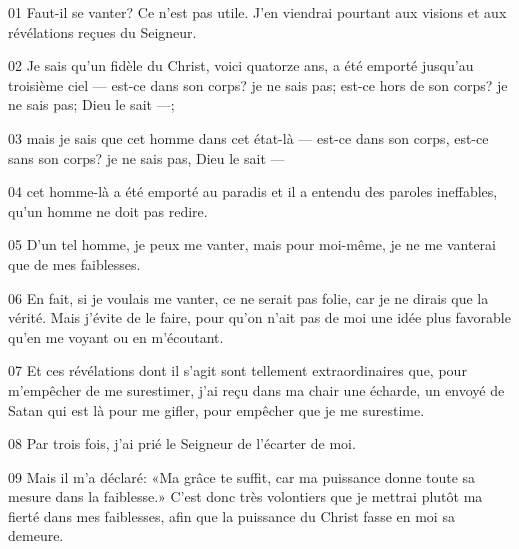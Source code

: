 01 Faut-il se vanter? Ce n’est pas utile. J’en viendrai pourtant aux visions et aux révélations reçues du Seigneur.

02 Je sais qu’un fidèle du Christ, voici quatorze ans, a été emporté jusqu’au troisième ciel --- est-ce dans son corps? je ne sais pas; est-ce hors de son corps? je ne sais pas; Dieu le sait ---;

03 mais je sais que cet homme dans cet état-là --- est-ce dans son corps, est-ce sans son corps? je ne sais pas, Dieu le sait ---

04 cet homme-là a été emporté au paradis et il a entendu des paroles ineffables, qu’un homme ne doit pas redire.

05 D’un tel homme, je peux me vanter, mais pour moi-même, je ne me vanterai que de mes faiblesses.

06 En fait, si je voulais me vanter, ce ne serait pas folie, car je ne dirais que la vérité. Mais j’évite de le faire, pour qu’on n’ait pas de moi une idée plus favorable qu’en me voyant ou en m’écoutant.

07 Et ces révélations dont il s’agit sont tellement extraordinaires que, pour m’empêcher de me surestimer, j’ai reçu dans ma chair une écharde, un envoyé de Satan qui est là pour me gifler, pour empêcher que je me surestime.

08 Par trois fois, j’ai prié le Seigneur de l’écarter de moi.

09 Mais il m’a déclaré: «Ma grâce te suffit, car ma puissance donne toute sa mesure dans la faiblesse.» C’est donc très volontiers que je mettrai plutôt ma fierté dans mes faiblesses, afin que la puissance du Christ fasse en moi sa demeure.